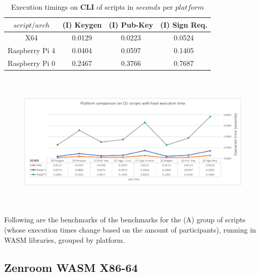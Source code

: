\documentclass[twocolumn]{article}
\begin{document}
\begin{table}[h!]
  \begin{center}
    \caption{Execution timings on \textbf{CLI} of scripts in $seconds$ per $platform$}
      \label{tab:table1}
        \begin{tabular} {c|c|c|c}
          \toprule
\textbf{$script / arch$} & \textbf{(I) Keygen} & \textbf{(I) Pub-Key} & \textbf{(I) Sign Req.} \\
          \midrule
			X64	&	0.0129	&	0.0223	&	0.0524	\\
Raspberry Pi 4	&	0.0404	&	0.0597	&	0.1405	\\
Raspberry Pi  0	&	0.2467	&	0.3766	&	0.7687	\\
      \bottomrule %
    \end{tabular}
  \end{center}
\end{table}



\begin{figure}[h!]
    \centering
    \includegraphics[width=6in, height=2.6in]{graphs/CLIfixed.png}
    \label{fig:galaxy}
\end{figure}

\newpage
\pagebreak

Following are the benchmarks of the benchmarks for the (A) group of scripts (whose execution times change based on the amount of participants), running in WASM libraries, grouped by platform.

\subsection*{Zenroom WASM X86-64}
\end{document}
